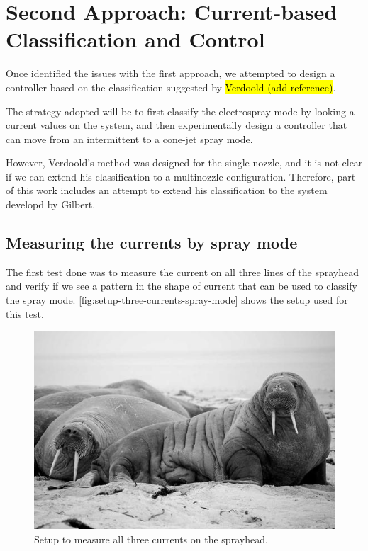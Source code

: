 \documentclass[oneside,12pt]{article}
\begin{document}
\blindtext %

\section{Second Approach: Current-based Classification and Control} 

Once identified the issues with the first approach, we attempted to design a 
controller based on the classification suggested by \hl{Verdoold (add reference)}.

The strategy adopted will be to first classify the electrospray mode by looking a current values 
on the system, and then experimentally design a controller that can move from an intermittent
to a cone-jet spray mode.

However, Verdoold's method was designed for the single nozzle, and it is not clear if we can 
extend his classification to a multinozzle configuration. Therefore, part of this work 
includes an attempt to extend his classification to the system developd by 
Gilbert.


\subsection{Measuring the currents by spray mode}

The first test done was to measure the current on all three lines of the sprayhead and 
verify if we see a pattern in the shape of current that can be used to classify the spray mode.
\autoref{fig:setup-three-currents-spray-mode} shows the setup used for this test.

\begin{figure}[h!]
    \centering
    \includegraphics[width=.8\textwidth,trim=1 1 1 1,clip]{figures/lorem-picsum.jpg}
    \caption{Setup to measure all three currents on the sprayhead.}
    \label{fig:setup-three-currents-spray-mode}
\end{figure}
\end{document}
